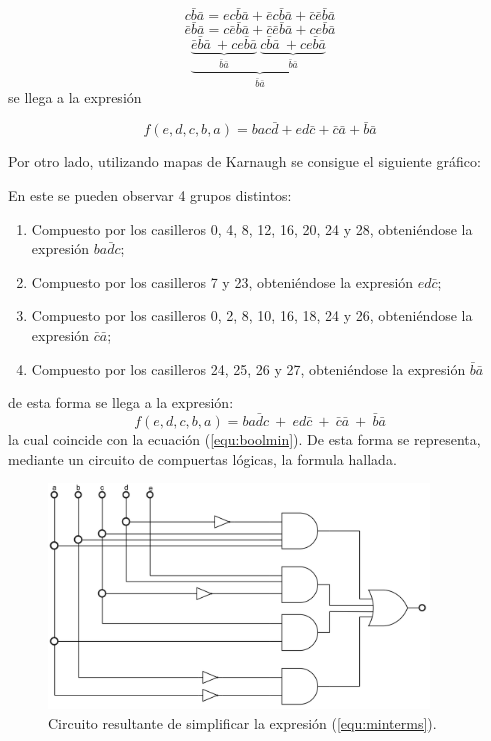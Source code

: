 \documentclass[a4paper]{article}
\begin{document}
\begin{center}
\[
		c\bar{b}\bar{a}= ec\bar{b}\bar{a}+\bar{e}c\bar{b}\bar{a}+\bar{c}\bar{e}\bar{b}\bar{a}
\]
\[
		\bar{e}\bar{b}\bar{a}=c\bar{e}\bar{b}\bar{a}+\bar{c}\bar{e}\bar{b}\bar{a}+ce\bar{b}\bar{a}
\]
\[
	\underbrace{\underbrace{\bar{e}\bar{b}\bar{a} \ + ce\bar{b}\bar{a}  }_{ \bar{b}\bar{a}}\ 
	\underbrace{c\bar{b}\bar{a} \ + ce\bar{b}\bar{a}  }_{ \bar{b}\bar{a}}\ }_{\bar{b}\bar{a}}
\]
se llega a la expresión

\begin{equation}
		f \left( e,d,c,b,a \right) =bac\bar{d}+ed\bar{c}+\bar{c}\bar{a}+\bar{b}\bar{a}
		\label{equ:boolmin}
\end{equation}
\end{center}

Por otro lado, utilizando mapas de Karnaugh se consigue el siguiente gráfico:



En este se pueden observar 4 grupos distintos:
\begin{enumerate}
	\item Compuesto por los casilleros 0, 4, 8, 12, 16, 20, 24 y 28, obteniéndose la expresión $ b a \bar{d} c $;
	\item Compuesto por los casilleros 7 y 23, obteniéndose la expresión $ e d \bar{c} $;
	\item Compuesto por los casilleros 0, 2, 8, 10, 16, 18, 24 y 26, obteniéndose la expresión $ \bar{c} \bar{a} $;
	\item Compuesto por los casilleros 24, 25, 26 y 27, obteniéndose la expresión $ \bar{b} \bar{a} $
\end{enumerate}

de esta forma se llega a la expresión:
\[
	f \left( e,d,c,b,a \right) = b a \bar{d} c \ + \  e d \bar{c} \ + \ \bar{c} \bar{a} \ + \ \bar{b} \bar{a}
\]
la cual coincide con la ecuación (\ref{equ:boolmin}). De esta forma se representa, mediante un circuito de compuertas lógicas, la formula hallada.

\begin{figure}[H]
	\centering
	\includegraphics[width=0.9\textwidth]{Circuito1.PNG}
\caption{Circuito resultante de simplificar la expresión (\ref{equ:minterms}).}
	\label{fig:circ1}
\end{figure}
\end{document}
